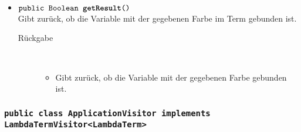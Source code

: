 \begin{description}
\begin{itemize}
		\item $\texttt{public Boolean \textbf{getResult}()}$ \\ Gibt zurück, ob die Variable mit der gegebenen Farbe im Term gebunden ist.
		\begin{description}
			\item[Rückgabe] \hfill \\
			\vspace{-.8cm}
			\begin{itemize}
				\item Gibt zurück, ob die Variable mit der gegebenen Farbe gebunden ist.
			\end{itemize}
		\end{description}
	\end{itemize}
\end{description}

\subsubsection{\normalfont \texttt{public class \textbf{ApplicationVisitor} implements LambdaTermVisitor<LambdaTerm>}}

